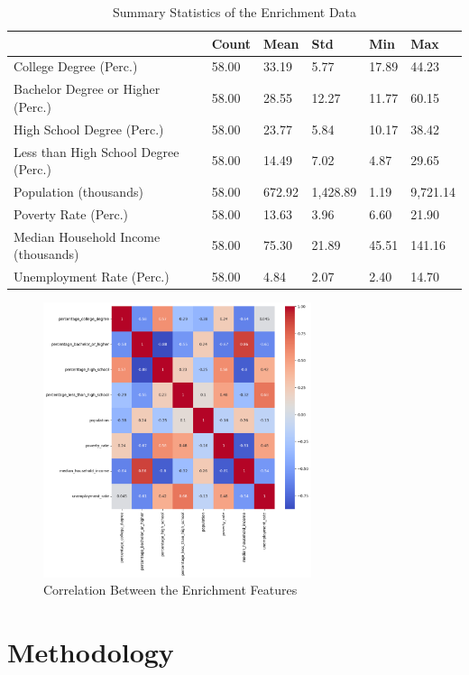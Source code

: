 \begin{table}[h]
    \centering
    \begin{tabularx}{\textwidth}{llllll}
    \hline
     & \textbf{Count} & \textbf{Mean} & \textbf{Std} & \textbf{Min} & \textbf{Max} \\
    \hline
    College Degree (Perc.) & 58.00 & 33.19 & 5.77 & 17.89 & 44.23 \\
    \hline
    Bachelor Degree or Higher (Perc.) & 58.00 & 28.55 & 12.27 & 11.77 & 60.15 \\
    \hline
    High School Degree (Perc.) & 58.00 & 23.77 & 5.84 & 10.17 & 38.42 \\
    \hline
    Less than High School Degree (Perc.) & 58.00 & 14.49 & 7.02 & 4.87 & 29.65 \\
    \hline
    Population (thousands) & 58.00 & 672.92 & 1,428.89 & 1.19 & 9,721.14 \\
    \hline
    Poverty Rate (Perc.) & 58.00 & 13.63 & 3.96 & 6.60 & 21.90 \\
    \hline
    Median Household Income (thousands) & 58.00 & 75.30 & 21.89 & 45.51 & 141.16 \\
    \hline
    Unemployment Rate (Perc.) & 58.00 & 4.84 & 2.07 & 2.40 & 14.70 \\
    \hline
    \end{tabularx}
    \caption{Summary Statistics of the Enrichment Data}
    \label{tab:enrichment_summary}
\end{table}

\begin{figure}[h]
    \centering
    \includegraphics[width=0.7\textwidth]{images/CH03_Enrichment_Correlation.png}
    \caption{Correlation Between the Enrichment Features}
    \label{fig:CH03_Enrichment_Correlation}
\end{figure}

\section{Methodology}\label{sec:Methodology}